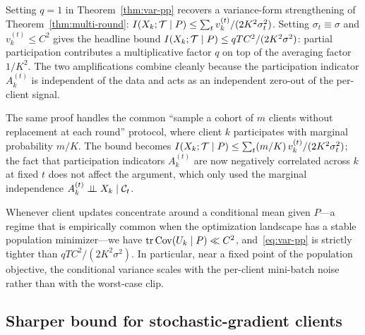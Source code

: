 \begin{remark}\label{rem:special}
Setting \(q=1\) in Theorem~\ref{thm:var-pp} recovers a variance-form strengthening of Theorem~\ref{thm:multi-round}: \(I(X_k;\mathcal{T}\mid P)\le\sum_t v_k^{(t)}/(2K^2\sigma_t^2)\). Setting \(\sigma_t\equiv\sigma\) and \(v_k^{(t)}\le C^2\) gives the headline bound \(I(X_k;\mathcal{T}\mid P)\le qTC^2/(2K^2\sigma^2)\): partial participation contributes a multiplicative factor \(q\) on top of the averaging factor \(1/K^2\). The two amplifications combine cleanly because the participation indicator \(A_k^{(t)}\) is independent of the data and acts as an independent zero-out of the per-client signal.
\end{remark}

\begin{remark}\label{rem:cohort}
The same proof handles the common ``sample a cohort of \(m\) clients without replacement at each round'' protocol, where client \(k\) participates with marginal probability \(m/K\). The bound becomes \(I(X_k;\mathcal{T}\mid P)\le\sum_t (m/K)\,v_k^{(t)}/(2K^2\sigma_t^2)\); the fact that participation indicators \(A_k^{(t)}\) are now negatively correlated across \(k\) at fixed \(t\) does not affect the argument, which only used the marginal independence \(A_k^{(t)}\perp\!\!\!\perp X_k\mid\mathcal C_t\).
\end{remark}

\begin{remark}\label{rem:variance-help}
Whenever client updates concentrate around a conditional mean given \(P\)---a regime that is empirically common when the optimization landscape has a stable population minimizer---we have \(\operatorname{tr}\operatorname{Cov}(U_k\mid P)\ll C^2\), and~\eqref{eq:var-pp} is strictly tighter than \(qTC^2/(2K^2\sigma^2)\). In particular, near a fixed point of the population objective, the conditional variance scales with the per-client mini-batch noise rather than with the worst-case clip.
\end{remark}

\subsection{Sharper bound for stochastic-gradient clients}\label{sec:non-iid}

